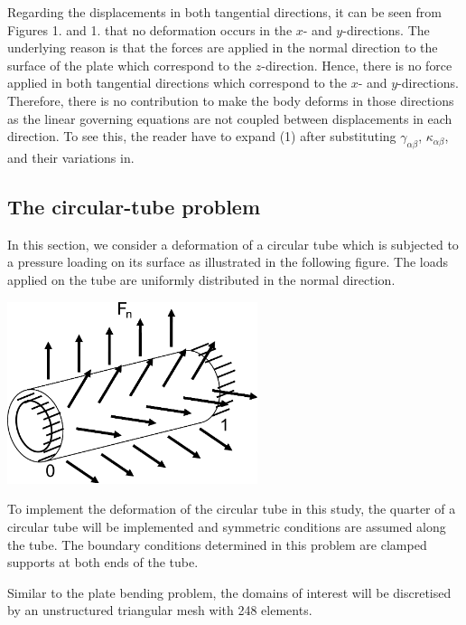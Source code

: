Regarding the displacements in both tangential directions, it can be seen from Figures 1. and 1. that no deformation occurs in the $ x $-\/ and $ y $-\/directions. The underlying reason is that the forces are applied in the normal direction to the surface of the plate which correspond to the $ z $-\/direction. Hence, there is no force applied in both tangential directions which correspond to the $ x $-\/ and $ y $-\/directions. Therefore, there is no contribution to make the body deforms in those directions as the linear governing equations are not coupled between displacements in each direction. To see this, the reader have to expand (1) after substituting $ \gamma_{\alpha\beta} $, $ \kappa_{\alpha\beta} $, and their variations in.



\hypertarget{index_tube}{}\subsection{The circular-\/tube problem}\label{index_tube}
In this section, we consider a deformation of a circular tube which is subjected to a pressure loading on its surface as illustrated in the following figure. The loads applied on the tube are uniformly distributed in the normal direction.

 
\begin{DoxyImage}
\includegraphics[width=0.55\textwidth]{circular_tube}
\end{DoxyImage}


To implement the deformation of the circular tube in this study, the quarter of a circular tube will be implemented and symmetric conditions are assumed along the tube. The boundary conditions determined in this problem are clamped supports at both ends of the tube.

Similar to the plate bending problem, the domains of interest will be discretised by an unstructured triangular mesh with 248 elements.

